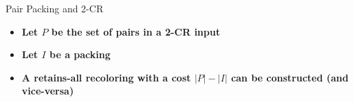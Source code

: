 \begin{frame}{Pair Packing and 2-CR}

\begin{itemize}

\item \textbf<1> 
{Let $P$ be the set of pairs in a 2-CR input}

\item \textbf<2>
{Let $I$ be a packing}

\item \textbf<3> 
{A retains-all recoloring with a cost $|P| - |I|$ can be constructed (and vice-versa)} 

\end{itemize}



\end{frame}